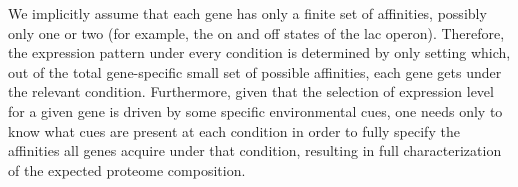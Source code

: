 We implicitly assume that each gene has only a finite set of affinities, possibly only one or two (for example, the on and off states of the lac operon).
Therefore, the expression pattern under every condition is determined by only setting which, out of the total gene-specific small set of possible affinities, each gene gets under the relevant condition.
Furthermore, given that the selection of expression level for a given gene is driven by some specific environmental cues, one needs only to know what cues are present at each condition in order to fully specify the affinities all genes acquire under that condition, resulting in full characterization of the expected proteome composition.
